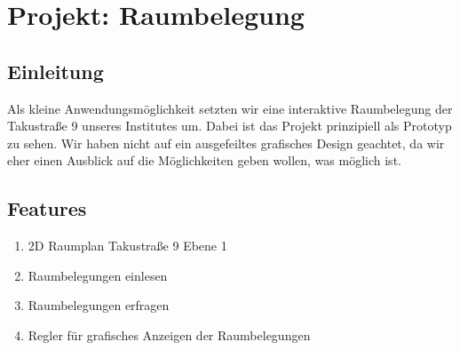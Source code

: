 \section{Projekt: Raumbelegung}

\subsection{Einleitung}
Als kleine Anwendungsmöglichkeit setzten wir eine interaktive Raumbelegung der Takustraße 9 unseres Institutes um. Dabei ist das Projekt prinzipiell als Prototyp zu sehen. Wir haben nicht auf ein ausgefeiltes grafisches Design geachtet, da wir eher einen Ausblick auf die Möglichkeiten geben wollen, was möglich ist.

\subsection{Features}
\begin{enumerate}
	\item 2D Raumplan Takustraße 9 Ebene 1
	\item Raumbelegungen einlesen
	\item Raumbelegungen erfragen
	\item Regler für grafisches Anzeigen der Raumbelegungen
\end{enumerate}



\newpage